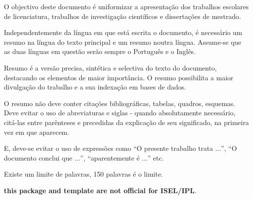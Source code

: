 \abstractPT  %

O objectivo deste documento é uniformizar a apresentação dos trabalhos escolares de licenciatura, trabalhos de investigação científicos e dissertações de mestrado.

Independentemente da língua em que está escrita o documento, é necessário um resumo na língua do texto principal e um resumo noutra língua.  Assume-se que as duas línguas em questão serão sempre o Português e o Inglês.

Resumo é a versão precisa, sintética e selectiva do texto do documento, destacando os elementos de maior importância. O resumo possibilita a maior divulgação do trabalho e a sua indexação em bases de dados.

O resumo não deve conter citações bibliográficas, tabelas, quadros, esquemas. Deve evitar o uso de abreviaturas e siglas - quando absolutamente necessário, citá-las entre parênteses e precedidas da explicação de seu significado, na primeira vez em que aparecem. 

E, deve-se evitar o uso de expressões como ``O presente trabalho trata $\ldots$'', ``O documento conclui que $\ldots$'', ``aparentemente é $\ldots$'' etc. 

Existe um limite de palavras, 150 palavras é o limite.

\begin{center}
	\textbf{\large this package and template are not official for ISEL/IPL}.
\end{center}